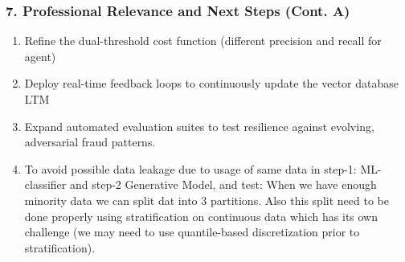 \documentclass[xcolor={dvipsnames,svgnames,table}]{beamer}
\begin{document}
\begin{frame}
	\frametitle{7. Professional Relevance and Next Steps (Cont. A)}
	\begin{enumerate}
		\item Refine the dual-threshold cost function (different precision and recall for agent)
		\item Deploy real-time feedback loops to continuously update the vector database LTM
		\item Expand automated evaluation suites to test resilience against evolving, adversarial fraud patterns.
		\item To avoid possible data leakage due to usage of same data in step-1: ML-classifier and step-2 Generative Model, and test: When we have enough minority data we can split dat into 3 partitions. Also this split need to be done properly using stratification on continuous data which has its own challenge (we may need to use quantile-based discretization  prior to stratification).
	\end{enumerate}
\end{frame}
%	
	
\end{document}
